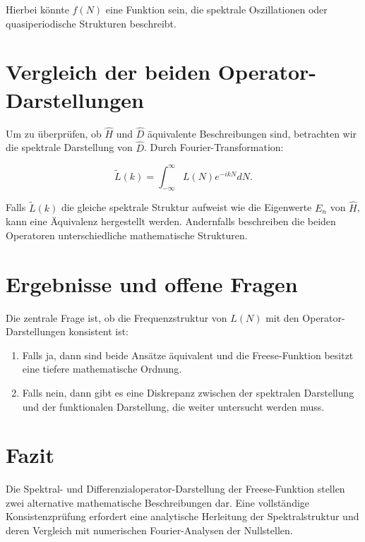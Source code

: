 \documentclass[a4paper,12pt]{article}
\begin{document}
Hierbei könnte \( f(N) \) eine Funktion sein, die spektrale Oszillationen oder quasiperiodische Strukturen beschreibt.

\section{Vergleich der beiden Operator-Darstellungen}
Um zu überprüfen, ob \( \hat{H} \) und \( \hat{D} \) äquivalente Beschreibungen sind, betrachten wir die spektrale Darstellung von \( \hat{D} \). Durch Fourier-Transformation:

\begin{equation}
    \tilde{L}(k) = \int_{-\infty}^{\infty} L(N) e^{-i k N} dN.
\end{equation}

Falls \( \tilde{L}(k) \) die gleiche spektrale Struktur aufweist wie die Eigenwerte \( E_n \) von \( \hat{H} \), kann eine Äquivalenz hergestellt werden. Andernfalls beschreiben die beiden Operatoren unterschiedliche mathematische Strukturen.

\section{Ergebnisse und offene Fragen}
Die zentrale Frage ist, ob die Frequenzstruktur von \( L(N) \) mit den Operator-Darstellungen konsistent ist:

\begin{enumerate}
    \item Falls ja, dann sind beide Ansätze äquivalent und die Freese-Funktion besitzt eine tiefere mathematische Ordnung.
    \item Falls nein, dann gibt es eine Diskrepanz zwischen der spektralen Darstellung und der funktionalen Darstellung, die weiter untersucht werden muss.
\end{enumerate}

\section{Fazit}
Die Spektral- und Differenzialoperator-Darstellung der Freese-Funktion stellen zwei alternative mathematische Beschreibungen dar. Eine vollständige Konsistenzprüfung erfordert eine analytische Herleitung der Spektralstruktur und deren Vergleich mit numerischen Fourier-Analysen der Nullstellen.
\end{document}
